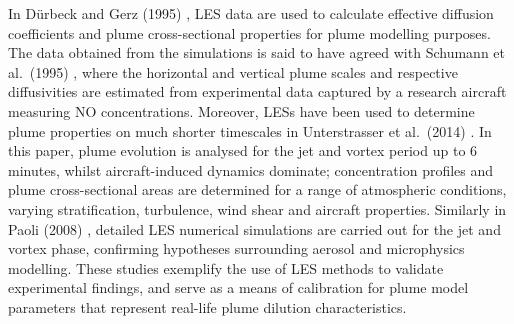 In D{\"u}rbeck and Gerz (1995) \cite{Durbeck1995}, LES data are used to calculate effective diffusion coefficients and plume cross-sectional properties for plume modelling purposes. The data obtained from the simulations is said to have agreed with Schumann et al.\ (1995) \cite{Schumann1995}, where the horizontal and vertical plume scales and respective diffusivities are estimated from experimental data captured by a research aircraft measuring NO concentrations. Moreover, LESs have been used to determine plume properties on much shorter timescales in Unterstrasser et al.\ (2014) \cite{Unterstrasser2014}. In this paper, plume evolution is analysed for the jet and vortex period up to 6 minutes, whilst aircraft-induced dynamics dominate; concentration profiles and plume cross-sectional areas are determined for a range of atmospheric conditions, varying stratification, turbulence, wind shear and aircraft properties. Similarly in Paoli (2008) \cite{Paoli2008}, detailed LES numerical simulations are carried out for the jet and vortex phase, confirming hypotheses surrounding aerosol and microphysics modelling. These studies exemplify the use of LES methods to validate experimental findings, and serve as a means of calibration for plume model parameters that represent real-life plume dilution characteristics.




